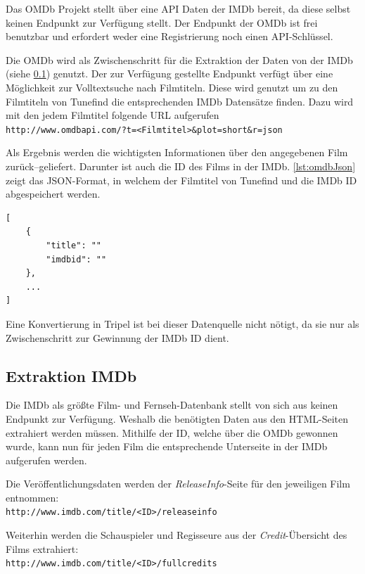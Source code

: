 \documentclass[parskip]{scrartcl}
\begin{document}
Das OMDb Projekt stellt über eine API Daten der IMDb bereit, da diese selbst keinen Endpunkt zur Verfügung stellt. Der Endpunkt der OMDb ist frei benutzbar und erfordert weder eine Registrierung noch einen API-Schlüssel.

Die OMDb wird als Zwischenschritt für die Extraktion der Daten von der IMDb (siehe \ref{subsec:imdb}) genutzt. Der zur Verfügung gestellte Endpunkt verfügt über eine Möglichkeit zur Volltextsuche nach Filmtiteln. Diese wird genutzt um zu den Filmtiteln von Tunefind die entsprechenden IMDb Datensätze finden. Dazu wird mit den jedem Filmtitel folgende URL aufgerufen\\
\texttt{http://www.omdbapi.com/?t=<Filmtitel>\&plot=short\&r=json}

Als Ergebnis werden die wichtigsten Informationen über den angegebenen Film zurück--geliefert. Darunter ist auch die ID des Films in der IMDb. \autoref{lst:omdbJson} zeigt das JSON-Format, in welchem der Filmtitel von Tunefind und die IMDb ID abgespeichert werden.

\begin{lstlisting}[caption={OMDb JSON-Format}, label={lst:omdbJson}]
[  
    {  
        "title": ""
        "imdbid": ""
    },
    ...
]
\end{lstlisting}

Eine Konvertierung in Tripel ist bei dieser Datenquelle nicht nötigt, da sie nur als Zwischenschritt zur Gewinnung der IMDb ID dient.

\subsection{Extraktion IMDb}
\label{subsec:imdb}

Die IMDb als größte Film- und Fernseh-Datenbank stellt von sich aus keinen Endpunkt zur Verfügung. Weshalb die benötigten Daten aus den HTML-Seiten extrahiert werden müssen. Mithilfe der ID, welche über die OMDb gewonnen wurde, kann nun für jeden Film die entsprechende Unterseite in der IMDb aufgerufen werden.

Die Veröffentlichungsdaten werden der \textit{ReleaseInfo}-Seite für den jeweiligen Film entnommen:\\
\texttt{http://www.imdb.com/title/<ID>/releaseinfo}

Weiterhin werden die Schauspieler und Regisseure aus der \textit{Credit}-Übersicht des Films extrahiert:\\
\texttt{http://www.imdb.com/title/<ID>/fullcredits}
\end{document}

